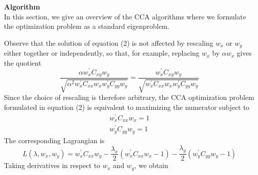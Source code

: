 \documentclass[fleqn,a4paper,12pt]{article}
\begin{document}
\noindent \textbf{Algorithm}\\

\noindent In this section, we give an overview of the CCA algorithms
where we formulate the optimization problem as a standard eigenproblem.

Observe that the solution of equation
(2) is not affected by rescaling $w_x$ or $w_y$ either together or independently,
so that, for example, replacing $w_x$ by $\alpha w_x$ gives the quotient
\begin{equation*}
\frac{\alpha w_x^{'}C_{xy} w_y }{\sqrt{\alpha^{2}w_x^{'}C_{xx} w_x w_y^{'}C_{yy} w_y}} =
\frac{ w_x^{'}C_{xy} w_y }{\sqrt{w_x^{'}C_{xx} w_x w_y^{'}C_{yy} w_y}}
\end{equation*}
\noindent Since the choice of rescaling is therefore arbitrary, the CCA optimization problem formulated in equation (2) is equivalent to maximizing the numerator subject to
\begin{align*}
w_x^{'}C_{xx} w_x = 1 \\
w_y^{'}C_{yy} w_y = 1 
\end{align*}
The corresponding Lagrangian is
\begin{equation*}
L(\lambda,w_x,w_y) = w_x^{'} C_{xx} w_y - \frac{\lambda_x}{2}(w_x^{'}C_{xx}w_x-1)- \frac{\lambda_y}{2}(w_y^{'}C_{yy}w_y-1)
\end{equation*}
Taking derivatives in respect to $w_x$ and $w_y$, we obtain
\end{document}
